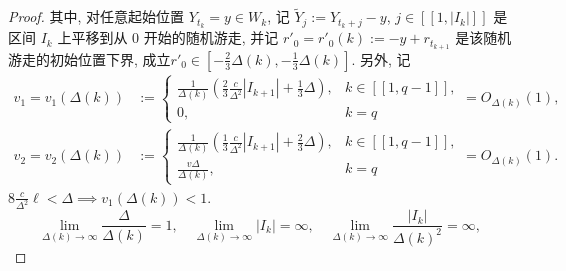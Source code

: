 \begin{proof}
{    }{
        其中, 对任意起始位置 $Y_{t_k} = y \in W_k$, 记 $\tilde Y_j:=Y_{t_k+j}-y$, $j\in[\![1, |I_k|]\!]$ 是区间 $I_k$ 上平移到从 $0$ 开始的随机游走, 并记 $r'_0=r'_0(k):=-y+r_{t_{k+1}}$ 是该随机游走的初始位置下界, 成立$r'_0\in[-\frac 23\Delta(k),-\frac 13\Delta(k)]$. 另外, 记
    }
    \begin{align*}
        v_1=v_1(\Delta(k)) &:= \begin{cases}
            \frac 1{\Delta(k)}\left(\frac 23\frac c{\Delta^2}|I_{k+1}|+\frac 13\Delta\right), & k\in[\![1, q-1]\!], \\
            0, & k=q
        \end{cases}
        =O_{\Delta(k)}(1),\\
        v_2=v_2(\Delta(k)) &:= \begin{cases}
            \frac 1{\Delta(k)}\left(\frac 13\frac c{\Delta^2}|I_{k+1}|+\frac 23\Delta\right), & k\in[\![1, q-1]\!], \\
            \frac{v\Delta}{\Delta(k)}, & k=q
        \end{cases}
        =O_{\Delta(k)}(1).
    \end{align*}
    $
        8\frac{c}{\Delta^2}\ell < \Delta
        \implies
        v_1(\Delta(k))
        <1.
    $
    \begin{equation*}
        \lim_{\Delta(k)\to\infty} \frac\Delta{\Delta(k)} = 1,
        \quad
        \lim_{\Delta(k)\to\infty} |I_k| = \infty,
        \quad
        \lim_{\Delta(k)\to\infty} \frac{|I_k|}{\Delta(k)^2} = \infty,
    \end{equation*}
    \begin{equation}

\end{equation}
\end{proof}
